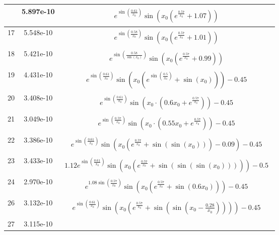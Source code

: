 \begin{center}
\begin{tabular}{|c|c|c|}
& 5.897e-10 & $\begin{aligned}e^{\sin{\left(\frac{0.61}{x_{0}} \right)}} \sin{\left(x_{0} \left(e^{\frac{0.57}{x_{0}}} + 1.07\right) \right)}\end{aligned}$\\ \hline17 & 5.548e-10 & $\begin{aligned}e^{\sin{\left(\frac{0.58}{x_{0}} \right)}} \sin{\left(x_{0} \left(e^{\frac{0.57}{x_{0}}} + 1.01\right) \right)}\end{aligned}$\\ \hline18 & 5.421e-10 & $\begin{aligned}e^{\sin{\left(\frac{0.58}{\sin{\left(x_{0} \right)}} \right)}} \sin{\left(x_{0} \left(e^{\frac{0.57}{x_{0}}} + 0.99\right) \right)}\end{aligned}$\\ \hline19 & 4.431e-10 & $\begin{aligned}e^{\sin{\left(\frac{0.61}{x_{0}} \right)}} \sin{\left(x_{0} \left(e^{\sin{\left(\frac{0.5}{x_{0}} \right)}} + \sin{\left(x_{0} \right)}\right) \right)} - 0.45\end{aligned}$\\ \hline20 & 3.408e-10 & $\begin{aligned}e^{\sin{\left(\frac{0.61}{x_{0}} \right)}} \sin{\left(x_{0} \cdot \left(0.6 x_{0} + e^{\frac{0.57}{x_{0}}}\right) \right)} - 0.45\end{aligned}$\\ \hline21 & 3.049e-10 & $\begin{aligned}e^{\sin{\left(\frac{0.57}{x_{0}} \right)}} \sin{\left(x_{0} \cdot \left(0.55 x_{0} + e^{\frac{0.57}{x_{0}}}\right) \right)} - 0.45\end{aligned}$\\ \hline22 & 3.386e-10 & $\begin{aligned}e^{\sin{\left(\frac{0.61}{x_{0}} \right)}} \sin{\left(x_{0} \left(e^{\frac{0.57}{x_{0}}} + \sin{\left(\sin{\left(x_{0} \right)} \right)}\right) - 0.09 \right)} - 0.45\end{aligned}$\\ \hline23 & 3.433e-10 & $\begin{aligned}1.12 e^{\sin{\left(\frac{0.61}{x_{0}} \right)}} \sin{\left(x_{0} \left(e^{\frac{0.57}{x_{0}}} + \sin{\left(\sin{\left(\sin{\left(x_{0} \right)} \right)} \right)}\right) \right)} - 0.5\end{aligned}$\\ \hline24 & 2.970e-10 & $\begin{aligned}e^{1.08 \sin{\left(\frac{0.57}{x_{0}} \right)}} \sin{\left(x_{0} \left(e^{\frac{0.57}{x_{0}}} + \sin{\left(0.6 x_{0} \right)}\right) \right)} - 0.45\end{aligned}$\\ \hline26 & 3.132e-10 & $\begin{aligned}e^{\sin{\left(\frac{0.61}{x_{0}} \right)}} \sin{\left(x_{0} \left(e^{\frac{0.57}{x_{0}}} + \sin{\left(\sin{\left(x_{0} - \frac{0.28}{x_{0}} \right)} \right)}\right) \right)} - 0.45\end{aligned}$\\ \hline27 & 3.115e-10 & 
\end{tabular}
\end{center}
